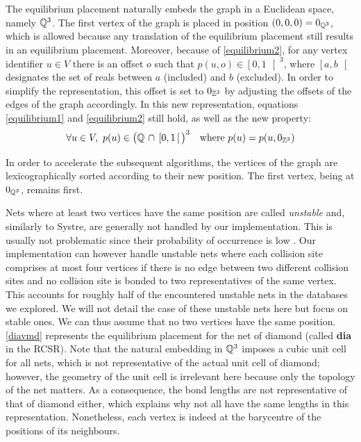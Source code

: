\documentclass[main.tex]{subfiles}
\begin{document}
The equilibrium placement naturally embeds the graph in a Euclidean space, namely $\mathbb{Q}^3$. The first vertex of the graph is placed in position $(0,0,0) = 0_{\mathbb{Q}^3}$, which is allowed because any translation of the equilibrium placement still results in an equilibrium placement.
Moreover, because of \autoref{equilibrium2}, for any vertex identifier $u\in V$ there is an offset $o$ such that $p(u,o)\in\left[0,1\,\right[^3$, where $\left[a,b\,\right[$ designates the set of reals between $a$ (included) and $b$ (excluded). In order to simplify the representation, this offset is set to $0_{\mathbb{Z}^3}$ by adjusting the offsets of the edges of the graph accordingly. In this new representation, equations \ref{equilibrium1} and \ref{equilibrium2} still hold, as well as the new property:
\[\forall u\in V,\ p(u)\in \big(\mathbb{Q}\,\cap\,\left[0,1\,\right[\big)^3\quad\text{where }p(u) = p(u,0_{\mathbb{Z}^3})\]

In order to accelerate the subsequent algorithms, the vertices of the graph are lexicographically sorted according to their new position. The first vertex, being at $0_{\mathbb{Q}^3}$, remains first.

Nets where at least two vertices have the same position are called \emph{unstable} and, similarly to Systre, are generally not handled by our implementation. This is usually not problematic since their probability of occurrence is low \autocite{unstableNets}. Our implementation can however handle unstable nets where each collision site comprises at most four vertices if there is no edge between two different collision sites and no collision site is bonded to two representatives of the same vertex. This accounts for roughly half of the encountered unstable nets in the databases we explored. We will not detail the case of these unstable nets here but focus on stable ones. We can thus assume that no two vertices have the same position.\\

\autoref{diavmd} represents the equilibrium placement for the net of diamond (called {\bf dia} in the RCSR). Note that the natural embedding in $\mathbb{Q}^3$ imposes a cubic unit cell for all nets, which is not representative of the actual unit cell of diamond; however, the geometry of the unit cell is irrelevant here because only the topology of the net matters. As a consequence, the bond lengths are not representative of that of diamond either, which explains why not all have the same lengths in this representation. Nonetheless, each vertex is indeed at the barycentre of the positions of its neighbours.
\end{document}
